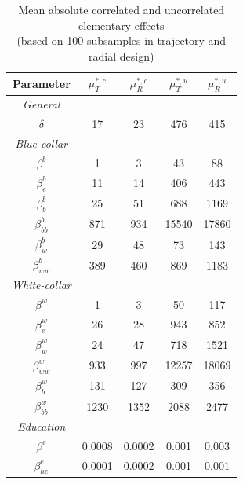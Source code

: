 \newpage
\setlength{\tabcolsep}{22pt} %
\begin{table}[H] 
	\centering
	\begin{threeparttable}
		\caption[Quantitative GSA measures for the Occupational Choice Model]{Mean absolute correlated and uncorrelated elementary effects\\ (based on 100 subsamples in trajectory and radial design)}
		\label{tab:devees}
		\renewcommand{\arraystretch}{1.2}%
		\begin{tabular}{cS[table-format=3.2]S[table-format=3.2]@{\hskip 0.7in}|@{\hskip 0.5in}S[table-format=3.2]S[table-format=3.2]}
			
			{Parameter}     & {$\mu^{*,c}_T$}   & {$\mu^{*,c}_R$} & {$\mu^{*,u}_T$} & {$\mu^{*,u}_R$}\\ \midrule
			\textit{General} \\
			$\delta$ & 17   & 23 & 476 & 415   \\    \midrule
			\textit{Blue-collar}\\    
			$\beta^b$ & 1   & 3            & 43 & 88    \\
			$\beta_e^b$ & 11  &    14        & 406  & 443    \\
			$\beta^b_b$ & 25  & 51            & 688  & 1169    \\
			$\beta^b_{bb}$ & 871 & 934           & 15540  & 17860     \\
			$\beta^b_w$ & 29    & 48             & 73  &  143  \\
			$\beta^b_{ww}$ & 389    & 460           & 869 &  1183    \\ \midrule
			\textit{White-collar}\\
			$\beta^w$ & 1   & 3            & 50 &  117   \\
			$\beta^w_e$ & 26   & 28          & 943 &  852    \\
			$\beta^w_w$ & 24  & 47            & 718 &  1521   \\
			$\beta^w_{ww}$ & 933  & 997           & 12257 & 18069   \\
			$\beta^w_b$ & 131 & 127           & 309 &  356   \\
			$\beta^w_{bb}$ & 1230 & 1352         & 2088 &  2477   \\ \midrule
			\textit{Education} \\
			$\beta^e$     & 0.0008    & 0.0002              & 0.001&  0.003   \\
			$\beta_{he}^e$     & 0.0001    & 0.0002              & 0.001  & 0.001    \\

\end{tabular}
\end{threeparttable}
\end{table}
